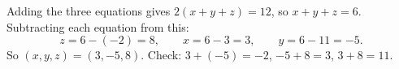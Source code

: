 Adding the three equations gives $2(x+y+z)=12$, so $x+y+z=6$. Subtracting each equation from this:
\[z=6-(-2)=8,\qquad x=6-3=3,\qquad y=6-11=-5.\]
So $\boxed{(x,y,z)=(3,-5,8)}$. Check: $3+(-5)=-2$, $-5+8=3$, $3+8=11$.
